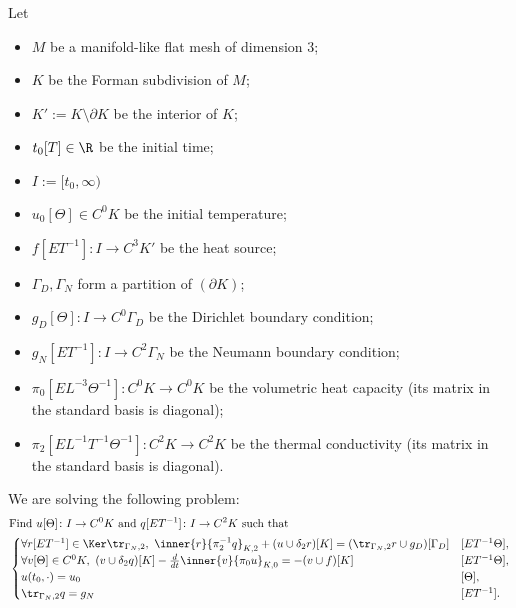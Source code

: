 \begin{formulation}
  Let
  \begin{itemize}
    \item
      $M$ be a manifold-like flat mesh of dimension $3$;
    \item
      $K$ be the Forman subdivision of $M$;
    \item
      $K' := K \setminus \partial K$ be the interior of $K$;
    \item
      $t_0 [T]\in \R$ be the initial time;
    \item
      $I := [t_0, \infty)$
    \item
      $u_0 [\Theta] \in C^0 K$ be the initial temperature;
    \item
      $f [E T^{-1}] \colon I \to C^3 K'$ be the heat source;
    \item
      $\Gamma_D, \Gamma_N$ form a partition of $(\partial K)$;
    \item
      $g_D [\Theta] \colon I \to C^0 \Gamma_D$
      be the Dirichlet boundary condition;
    \item
      $g_N [E T^{-1}] \colon I \to C^2 \Gamma_N$
      be the Neumann boundary condition;
    \item
      $\pi_0 [E L^{-3} \Theta^{-1}] \colon C^0 K \to C^0 K$
      be the volumetric heat capacity
      (its matrix in the standard basis is diagonal);
    \item
      $\pi_2 [E L^{-1} T^{-1} \Theta^{-1}] \colon C^2 K \to C^2 K$
      be the thermal conductivity
      (its matrix in the standard basis is diagonal).
  \end{itemize}
  We are solving the following problem:
  \begin{equation}
    \begin{split}
      & \text{Find $u [\Theta] \colon I \to C^0 K$ and
        $q [E T^{-1}] \colon I \to C^2 K$ such that} \\
      &
      \begin{cases}
        \forall r [E T^{-1}]\in \Ker \tr_{\Gamma_N, 2},\
          \inner{r}{\pi_2^{-1} q}_{K, 2} + (u \cup \delta_2 r)[K]
          = (\tr_{\Gamma_N, 2} r \cup g_D)[\Gamma_D] & [E T^{-1} \Theta], \\
        \forall v [\Theta]\in C^0 K,\
          (v \cup \delta_2 q)[K] - \frac{d}{d t} \inner{v}{\pi_0 u}_{K, 0}
          = - (v \cup f)[K] & [E T^{-1} \Theta], \\
        u(t_0, \cdot) = u_0 & [\Theta], \\
        \tr_{\Gamma_N, 2} q = g_N & [E T^{-1}].

\end{cases}
\end{split}
\end{equation}
\end{formulation}
